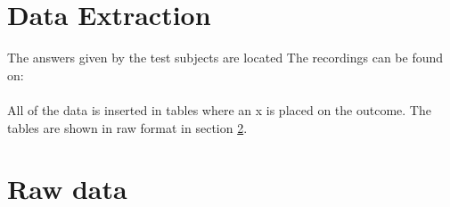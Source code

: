 \section{Data Extraction}
The answers given by the test subjects are located
The recordings can be found on:\\
\\
All of the data is inserted in tables where an x is placed on the outcome. The tables are shown in raw format in section \ref{sec:rawdata_listning}.



\section{Raw data}\label{sec:rawdata_listning}

